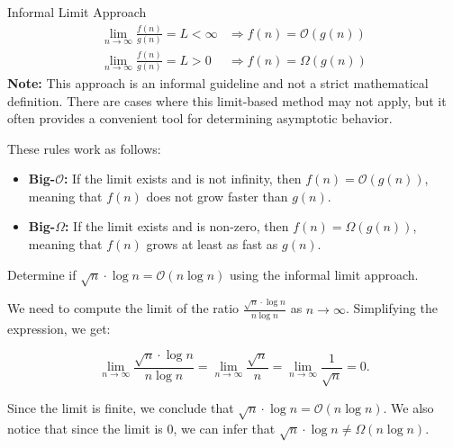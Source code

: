         \begin{custombox}{Informal Limit Approach}
            \[
                \begin{array}{ll}
                \displaystyle \lim_{n \to \infty} \frac{f(n)}{g(n)} = L<\infty & \Rightarrow f(n) = \mathcal{O}(g(n)) \\[10pt]
                \displaystyle \lim_{n \to \infty} \frac{f(n)}{g(n)} = L>0 & \Rightarrow f(n) = \Omega(g(n))
                \end{array}
                \]
                \medskip
                \textbf{Note:} This approach is an informal guideline and not a strict mathematical definition. There are cases where this limit-based method may not apply, but it often provides a convenient tool for determining asymptotic behavior.
        \end{custombox}
        
        These rules work as follows:
        \begin{itemize}
            \item \textbf{Big-\(\mathcal{O}\):} If the limit exists and is not infinity, then \( f(n) = \mathcal{O}(g(n)) \), meaning that \( f(n) \) does not grow faster than \( g(n) \).
            \item \textbf{Big-\(\Omega\):} If the limit exists and is non-zero, then \( f(n) = \Omega(g(n)) \), meaning that \( f(n) \) grows at least as fast as \( g(n) \).
        \end{itemize}
        
        \begin{example}
            Determine if $\sqrt{n} \cdot \log n=\mathcal{O}(n \log n)$ using the informal limit approach.
        \end{example}

        \begin{solution}
            We need to compute the limit of the ratio \( \frac{\sqrt{n} \cdot \log n}{n \log n} \) as \( n \to \infty \). Simplifying the expression, we get:
            
            \[
            \lim_{n \to \infty} \frac{\sqrt{n} \cdot \log n}{n \log n} = \lim_{n \to \infty} \frac{\sqrt{n}}{n} = \lim_{n \to \infty} \frac{1}{\sqrt{n}} = 0.
            \]
            
            Since the limit is finite, we conclude that \( \sqrt{n} \cdot \log n = \mathcal{O}(n \log n) \). We also notice that since the limit is 0, we can infer that \( \sqrt{n} \cdot \log n \neq \Omega(n \log n) \).
            
        \end{solution}

